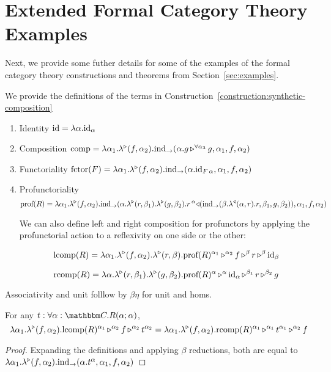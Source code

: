 \documentclass{llncs}
\begin{document}
\section{Extended Formal Category Theory Examples}
\label{sec:appendix:examples}

Next, we provide some futher details for some of the examples of the
formal category theory constructions and theorems from
Section~\ref{sec:examples}.

\begin{definition}
  We provide the definitions of the terms in Construction~\ref{construction:synthetic-composition}
  \begin{enumerate}
  \item Identity $\id = \pendlambdaXdotY \alpha \punitrefl \alpha$
  \item Composition $\textrm{comp} = \lambdaunary {\alpha_1} f {\alpha_2} \punitelimkontZatABC {\alpha. \homrallXYtoZ {\alpha_3} g g} {\alpha_1} f {\alpha_2}$
  \item Functoriality $\textrm{fctor}(F) = \lambdaunary {\alpha_1} f {\alpha_2} \punitelimkontZatABC {\alpha. \punitrefl{F\,\alpha}} {\alpha_1} f {\alpha_2}$
  \item Profunctoriality
    \[\textrm{prof}(R) = \lambdaunary {\alpha_1} f {\alpha_2} {\punitelimkontZatABC {\alpha. \homrlambdaXatYdotZ r {\beta_1} \homrlambdaXatYdotZ g {\beta_2} {\homlappXtoYatZ {(\punitelimkontZatABC {\beta. \homllambdaXatYdotZ r \alpha r}{\beta_1}{g}{\beta_2})} {r} {\alpha}}}{\alpha_1} f {\alpha_2}}\]

    We can also define left and right composition for profunctors by
    applying the profunctorial action to a reflexivity on one side or
    the other:

    \[ \textrm{lcomp}(R) = \lambdabinary {\alpha_1} f {\alpha_2} r {\beta} {\apptrinary {\textrm{prof}(R)} {\alpha_1} f {\alpha_2} r {\beta} {\punitrefl \beta} {\beta}}\]
    
    \[ \textrm{rcomp}(R) = \lambdabinary {\alpha} r {\beta_1} g {\beta_2} {\apptrinary {\textrm{prof}(R)}  {\alpha} {\punitrefl \alpha} {\alpha} r {\beta_1} g {\beta_2}}\]
  \end{enumerate}
  Associativity and unit folllow by $\beta\eta$ for unit and homs.
\end{definition}

\begin{lemma}[Naturality]
  For any $t : \pendallXdotY {\alpha:\cat C}{\harrapp R \alpha \alpha}$,
  \[ \lambdaunary {\alpha_1} f {\alpha_2} {\appbinary {\textrm{lcomp}(R)}{\alpha_1} f {\alpha_2} {\pendappXtoY t {\alpha_2}} {\alpha_2}}
  =  \lambdaunary {\alpha_1} f {\alpha_2} {\appbinary {\textrm{rcomp}(R)}{\alpha_1}  {\pendappXtoY t {\alpha_1}} {\alpha_1} f {\alpha_2}}\]
\end{lemma}
\begin{proof}
  Expanding the definitions and applying $\beta$ reductions, both are equal to $\lambdaunary {\alpha_1} f {\alpha_2} \punitelimkontZatABC {\alpha. \pendappXtoY t \alpha} {\alpha_1} f {\alpha_2}$
\end{proof}
\end{document}
